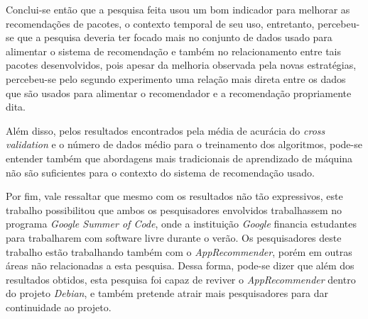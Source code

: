 Conclui-se então que a pesquisa feita usou um bom indicador para melhorar as
recomendações de pacotes, o contexto temporal de seu uso, entretanto,
percebeu-se que a pesquisa deveria ter focado mais no conjunto de dados usado
para alimentar o sistema de recomendação e também no relacionamento entre tais
pacotes desenvolvidos, pois apesar da melhoria observada pela novas estratégias,
percebeu-se pelo segundo experimento uma relação mais direta entre os dados que
são usados para alimentar o recomendador e a recomendação propriamente dita.

Além disso, pelos resultados encontrados pela média de acurácia do \textit{cross
validation} e o número de dados médio para o treinamento dos algoritmos, pode-se
entender também que abordagens mais tradicionais de aprendizado de máquina não
são suficientes para o contexto do sistema de recomendação usado.

Por fim, vale ressaltar que mesmo com os resultados não tão expressivos, este
trabalho possibilitou que ambos os pesquisadores envolvidos trabalhassem no
programa \textit{Google Summer of Code}, onde a instituição \textit{Google}
financia estudantes para trabalharem com software livre durante o verão. Os
pesquisadores deste trabalho estão trabalhando também com o
\textit{AppRecommender}, porém em outras áreas não relacionadas a esta pesquisa.
Dessa forma, pode-se dizer que além dos resultados obtidos, esta pesquisa foi
capaz de reviver o \textit{AppRecommender} dentro do projeto \textit{Debian},
e também pretende atrair mais pesquisadores para dar continuidade ao projeto.
